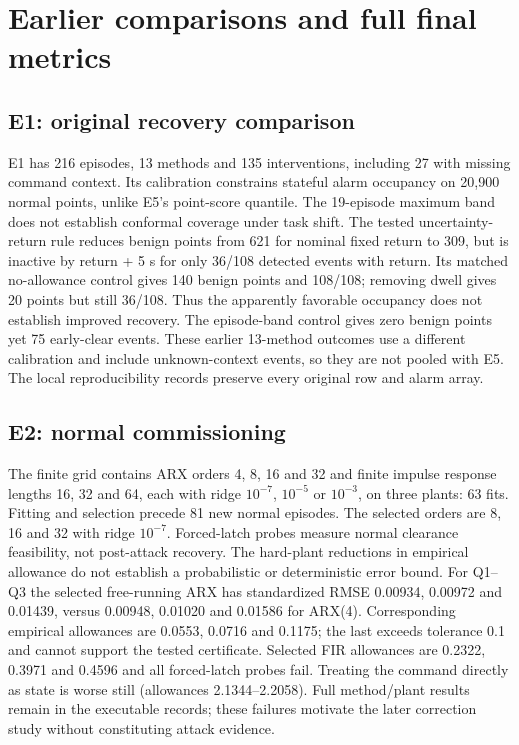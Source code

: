 \section{Earlier comparisons and full final metrics}\label{app:earlier}

\subsection{E1: original recovery comparison}
E1 has 216 episodes, 13 methods and 135 interventions, including 27 with missing command context. Its calibration constrains stateful alarm occupancy on 20,900 normal points, unlike E5's point-score quantile. The 19-episode maximum band does not establish conformal coverage under task shift.
The tested uncertainty-return rule reduces benign points from 621 for nominal fixed return to 309, but is inactive by return + 5 s for only 36/108 detected events with return. Its matched no-allowance control gives 140 benign points and 108/108; removing dwell gives 20 points but still 36/108. Thus the apparently favorable occupancy does not establish improved recovery. The episode-band control gives zero benign points yet 75 early-clear events. These earlier 13-method outcomes use a different calibration and include unknown-context events, so they are not pooled with E5. The local reproducibility records preserve every original row and alarm array.

\subsection{E2: normal commissioning}
The finite grid contains ARX orders 4, 8, 16 and 32 and finite impulse response lengths 16, 32 and 64, each with ridge $10^{-7}$, $10^{-5}$ or $10^{-3}$, on three plants: 63 fits. Fitting and selection precede 81 new normal episodes. The selected orders are 8, 16 and 32 with ridge $10^{-7}$. Forced-latch probes measure normal clearance feasibility, not post-attack recovery. The hard-plant reductions in empirical allowance do not establish a probabilistic or deterministic error bound.
For Q1--Q3 the selected free-running ARX has standardized RMSE 0.00934, 0.00972 and 0.01439, versus 0.00948, 0.01020 and 0.01586 for ARX(4). Corresponding empirical allowances are 0.0553, 0.0716 and 0.1175; the last exceeds tolerance 0.1 and cannot support the tested certificate. Selected FIR allowances are 0.2322, 0.3971 and 0.4596 and all forced-latch probes fail. Treating the command directly as state is worse still (allowances 2.1344--2.2058). Full method/plant results remain in the executable records; these failures motivate the later correction study without constituting attack evidence.

